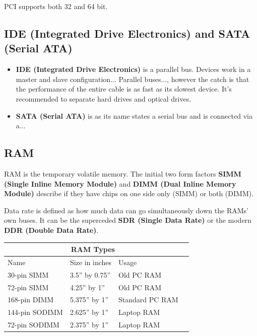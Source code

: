 \documentclass{article}
\begin{document}
PCI supports both 32 and 64 bit.

\subsection{IDE (Integrated Drive Electronics) and SATA (Serial ATA)}


\begin{itemize}
    \item \textbf{IDE (Integrated Drive Electronics)} is a parallel bus. Devices work in a master and slave configuration... Parallel buses..., however the catch is that the performance of the entire cable is as fast as its slowest device. It's recommended to separate hard drives and optical drives.
    \item \textbf{SATA (Serial ATA)} is as its name states a serial bus and is connected via a...
\end{itemize}


\subsection{RAM}

RAM is the temporary volatile memory. The initial two form factors \textbf{SIMM (Single Inline Memory Module)} and \textbf{DIMM (Dual Inline Memory Module)} describe if they have chips on one side only (SIMM) or both (DIMM).

Data rate is defined as how much data can go simultaneously down the RAMs' own buses. It can be the superceded \textbf{SDR (Single Data Rate)} or the modern \textbf{DDR (Double Data Rate)}.\\

\begin{tabular}{ |p{3cm}||p{3cm}|p{3cm}|p{3cm}|  }
 \hline
 \multicolumn{3}{|c|}{\textbf{RAM Types}} \\
 \hline
 Name & Size in inches & Usage\\
 \hline
 30-pin SIMM & 3.5'' by 0.75'' & Old PC RAM\\
 72-pin SIMM & 4.25'' by 1'' & Old PC RAM\\
 168-pin DIMM & 5.375'' by 1'' & Standard PC RAM\\
 144-pin SODIMM & 2.625'' by 1'' & Laptop RAM\\
 72-pin SODIMM & 2.375'' by 1'' & Laptop RAM\\
 \hline
\end{tabular}
\end{document}
